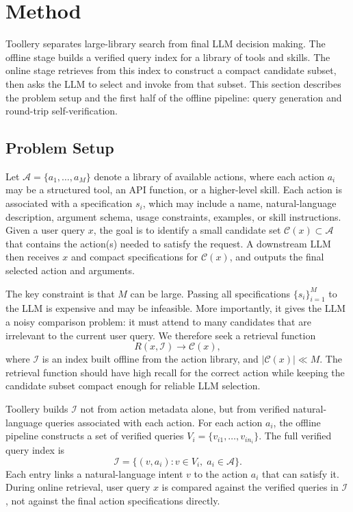 \documentclass[11pt]{article}
\begin{document}
\section{Method}
\label{sec:method}
Toollery separates large-library search from final LLM decision making. The offline stage builds a verified query index for a library of tools and skills. The online stage retrieves from this index to construct a compact candidate subset, then asks the LLM to select and invoke from that subset. This section describes the problem setup and the first half of the offline pipeline: query generation and round-trip self-verification.

\subsection{Problem Setup}
\label{sec:problem_setup}

Let $\mathcal{A} = \{a_1, \ldots, a_M\}$ denote a library of available actions, where each action $a_i$ may be a structured tool, an API function, or a higher-level skill. Each action is associated with a specification $s_i$, which may include a name, natural-language description, argument schema, usage constraints, examples, or skill instructions. Given a user query $x$, the goal is to identify a small candidate set $\mathcal{C}(x) \subset \mathcal{A}$ that contains the action(s) needed to satisfy the request. A downstream LLM then receives $x$ and compact specifications for $\mathcal{C}(x)$, and outputs the final selected action and arguments.

The key constraint is that $M$ can be large. Passing all specifications $\{s_i\}_{i=1}^{M}$ to the LLM is expensive and may be infeasible. More importantly, it gives the LLM a noisy comparison problem: it must attend to many candidates that are irrelevant to the current user query. We therefore seek a retrieval function
\begin{equation}
    R(x, \mathcal{I}) \rightarrow \mathcal{C}(x),
\end{equation}
where $\mathcal{I}$ is an index built offline from the action library, and $|\mathcal{C}(x)| \ll M$. The retrieval function should have high recall for the correct action while keeping the candidate subset compact enough for reliable LLM selection.

Toollery builds $\mathcal{I}$ not from action metadata alone, but from verified natural-language queries associated with each action. For each action $a_i$, the offline pipeline constructs a set of verified queries $V_i = \{v_{i1}, \ldots, v_{in_i}\}$. The full verified query index is
\begin{equation}
    \mathcal{I} = \{(v, a_i): v \in V_i,\; a_i \in \mathcal{A}\}.
\end{equation}
Each entry links a natural-language intent $v$ to the action $a_i$ that can satisfy it. During online retrieval, user query $x$ is compared against the verified queries in $\mathcal{I}$, not against the final action specifications directly.
\end{document}
